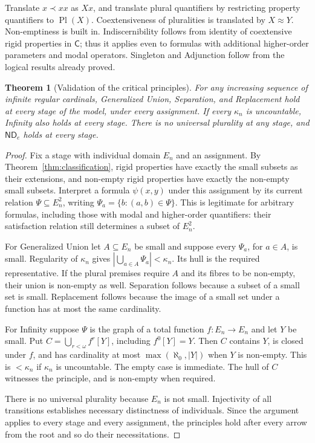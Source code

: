 \documentclass[11pt]{article}
\newtheorem{theorem}{Theorem}[section]
\theoremstyle{definition}
\newcommand{\Pl}{\operatorname{Pl}}
\newcommand{\C}{\mathsf C}
\newcommand{\rel}{\mathbin{\approx}}
\newcommand{\ND}{\mathsf{ND}_e}
\numberwithin{equation}{section}
\begin{document}
Translate $x\prec xx$ as $Xx$, and translate plural quantifiers by restricting property quantifiers to $\Pl(X)$. Coextensiveness of pluralities is translated by $X\rel Y$. Non-emptiness is built in. Indiscernibility follows from identity of coextensive rigid properties in $\C$; thus it applies even to formulas with additional higher-order parameters and modal operators. Singleton and Adjunction follow from the logical results already proved.

\begin{theorem}[Validation of the critical principles]\label{thm:critical}
For any increasing sequence of infinite regular cardinals, Generalized Union, Separation, and Replacement hold at every stage of the model, under every assignment. If every $\kappa_n$ is uncountable, Infinity also holds at every stage. There is no universal plurality at any stage, and $\ND$ holds at every stage.
\end{theorem}
\begin{proof}
Fix a stage with individual domain $E_n$ and an assignment. By Theorem~\ref{thm:classification}, rigid properties have exactly the small subsets as their extensions, and non-empty rigid properties have exactly the non-empty small subsets. Interpret a formula $\psi(x,y)$ under this assignment by its current relation $\Psi\subseteq E_n^2$, writing $\Psi_a=\{b:(a,b)\in\Psi\}$. This is legitimate for arbitrary formulas, including those with modal and higher-order quantifiers: their satisfaction relation still determines a subset of $E_n^2$.

For Generalized Union let $A\subseteq E_n$ be small and suppose every $\Psi_a$, for $a\in A$, is small. Regularity of $\kappa_n$ gives $|\bigcup_{a\in A}\Psi_a|<\kappa_n$. Its hull is the required representative. If the plural premises require $A$ and its fibres to be non-empty, their union is non-empty as well. Separation follows because a subset of a small set is small. Replacement follows because the image of a small set under a function has at most the same cardinality.

For Infinity suppose $\Psi$ is the graph of a total function $f:E_n\to E_n$ and let $Y$ be small. Put $C=\bigcup_{r<\omega}f^r[Y]$, including $f^0[Y]=Y$. Then $C$ contains $Y$, is closed under $f$, and has cardinality at most $\max(\aleph_0,|Y|)$ when $Y$ is non-empty. This is $<\kappa_n$ if $\kappa_n$ is uncountable. The empty case is immediate. The hull of $C$ witnesses the principle, and is non-empty when required.

There is no universal plurality because $E_n$ is not small. Injectivity of all transitions establishes necessary distinctness of individuals. Since the argument applies to every stage and every assignment, the principles hold after every arrow from the root and so do their necessitations.
\end{proof}
\end{document}
